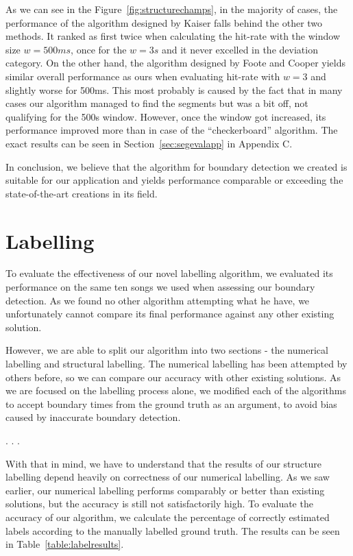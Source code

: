 As we can see in the Figure~\ref{fig:structurechamps}, in the majority of cases, the performance of the algorithm designed by Kaiser falls behind the other two methods. It ranked as first twice when calculating the hit-rate with the window size $w=500ms$, once for the $w=3s$ and it never excelled in the deviation category. On the other hand, the algorithm designed by Foote and Cooper yields similar overall performance as ours when evaluating hit-rate with $w=3$ and slightly worse for 500ms. This most probably is caused by the fact that in many cases our algorithm managed to find the segments but was a bit off, not qualifying for the 500s window. However, once the window got increased, its performance improved more than in case of the ``checkerboard'' algorithm. The exact results can be seen in Section~\ref{sec:segevalapp} in Appendix C. 

In conclusion, we believe that the algorithm for boundary detection we created is suitable for our application and yields performance comparable or exceeding the state-of-the-art creations in its field. 

\vspace{20pt}

\section{Labelling}

To evaluate the effectiveness of our novel labelling algorithm, we evaluated its performance on the same ten songs we used when assessing our boundary detection. As we found no other algorithm attempting what he have, we unfortunately cannot compare its final performance against any other existing solution. 

However, we are able to split our algorithm into two sections - the numerical labelling and structural labelling. The numerical labelling has been attempted by others before, so we can compare our accuracy with other existing solutions. As we are focused on the labelling process alone, we modified each of the algorithms to accept boundary times from the ground truth as an argument, to avoid bias caused by inaccurate boundary detection.

.  .  .

With that in mind, we have to understand that the results of our structure labelling depend heavily on correctness of our numerical labelling. As we saw earlier, our numerical labelling performs comparably or better than existing solutions, but the accuracy is still not satisfactorily high. 
To evaluate the accuracy of our algorithm, we calculate the percentage of correctly estimated labels according to the manually labelled ground truth. The results can be seen in Table~\ref{table:labelresults}. 

